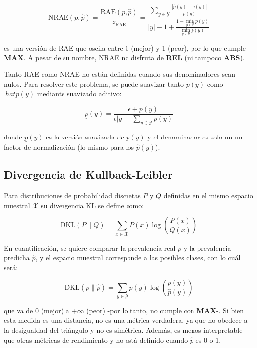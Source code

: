 \begin{equation}
    {\text{NRAE}(p, \hat p)} = \frac{\text{RAE}(p, \hat p)}{z_{\text{RAE}}} = \frac{\sum \limits_{y\in {\mathcal {Y}}}{\frac{|\hat p(y) - p(y)|}{p(y)}}}{|y| - 1 + \frac {1 - \displaystyle \min_{y\in {\mathcal {Y}}}p(y)}{\displaystyle \min_{y\in {\mathcal {Y}}}p(y)}}
\end{equation}

es una versión de RAE que oscila entre 0 (mejor) y 1 (peor), por lo que cumple
{\bf MAX}. A pesar de su nombre, NRAE no disfruta de {\bf REL} (ni tampoco {\bf
ABS}).

Tanto RAE como NRAE no están definidas cuando sus denominadores sean nulos. Para
resolver este problema, se puede suavizar tanto $p(y)$ como $\ hat p(y)$
mediante suavizado aditivo:

\begin{equation}
    \underline p(y) = \frac{\epsilon + p(y)}{\epsilon  |y| + \sum \limits_{y\in {\mathcal {Y}}}{p(y)}}
\end{equation}

donde $\underline p(y)$ es la versión suavizada de $p(y)$ y el denominador es
solo un un factor de normalización (lo mismo para los $\underline {\hat p}(y)$).

\subsection{Divergencia de Kullback-Leibler}

Para distribuciones de probabilidad discretas $P$ y $Q$ definidas en el mismo
espacio muestral ${\mathcal {X}}$ su divergencia KL se define como:

\begin{equation}
    {\text{DKL}}(P\parallel Q)=\sum _{x\in {\mathcal {X}}}P(x)\log \left({\frac {P(x)}{Q(x)}}\right)
\end{equation}

En cuantificación, se quiere comparar la prevalencia real $p$ y la prevalencia
predicha $\hat{p}$, y el espacio muestral corresponde a las posibles clases, con
lo cuál será:

\begin{equation}
    {\text{DKL}}(p\parallel \hat{p}) = \sum _{y\in {\mathcal {Y}}}p(y)\log \left({\frac {p(y)}{\hat p(y)}}\right)
\end{equation}

que va de {0} (mejor) a {+$\infty$} (peor) -por lo tanto, no cumple con {\bf
MAX}-. Si bien esta medida es una distancia, no es una métrica verdadera, ya que
no obedece a la desigualdad del triángulo y no es simétrica. Además, es menos
interpretable que otras métricas de rendimiento y no está definido cuando
$\hat{p}$ es 0 o 1.

